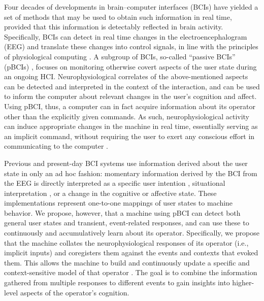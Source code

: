 Four decades of developments in brain–computer interfaces (BCIs) \cite{vidal1973direct,wolpaw2012bcibook} have yielded a set of methods that may be used to obtain such information in real time, provided that this information is detectably reflected in brain activity. Specifically, BCIs can detect in real time changes in the electroencephalogram (EEG) and translate these changes into control signals, in line with the principles of physiological computing \cite{fairclough2009fundamentals}. A subgroup of BCIs, so-called ``passive BCIs'' (pBCIs) \cite{zander2011}, focuses on monitoring otherwise covert aspects of the user state \cite{zander2012context} during an ongoing HCI. Neurophysiological correlates of the above-mentioned aspects can be detected and interpreted in the context of the interaction, and can be used to inform the computer about relevant changes in the user's cognition and affect. Using pBCI, thus, a computer can in fact acquire information about its operator other than the explicitly given commands. As such, neurophysiological activity can induce appropriate changes in the machine in real time, essentially serving as an implicit command, without requiring the user to exert any conscious effort in communicating to the computer \cite{zander2011}.

Previous and present-day BCI systems use information derived about the user state in only an ad hoc fashion: momentary information derived by the BCI from the EEG is directly interpreted as a specific user intention \cite{schultzekraft2016veto,zander2010gazeinput}, situational interpretation \cite{blankertz2011}, or a change in the cognitive \cite{gerjets2014workload} or affective \cite{chanel2009emotion} state. These implementations represent one-to-one mappings of user states to machine behavior. We propose, however, that a machine using pBCI can detect both general user states and transient, event-related responses, and can use these to continuously and accumulatively learn about its operator. Specifically, we propose that the machine collates the neurophysiological responses of its operator (i.e., implicit inputs) and coregisters them against the events and contexts that evoked them. This allows the machine to build and continuously update a specific and context-sensitive model of that operator \cite{zander2012context}. The goal is to combine the information gathered from multiple responses to different events to gain insights into higher-level aspects of the operator's cognition.

